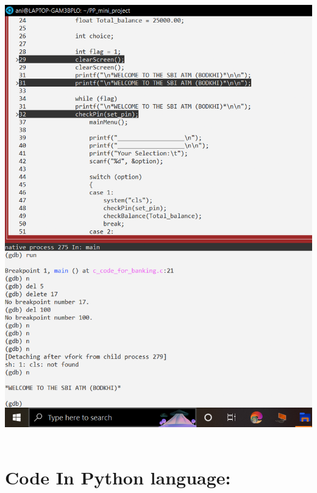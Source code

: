 \documentclass{article}
\begin{document}
\includegraphics[scale=0.35]{debugging4.png}    \\ \\

\newpage

\section{Code In Python language:}
\end{document}
